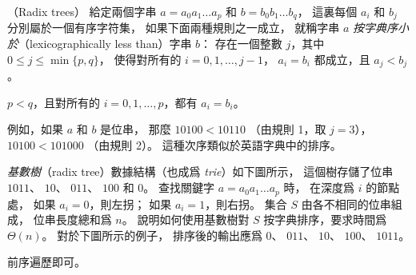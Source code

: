 \startPROBLEM
（Radix trees）
給定兩個字串 $a=a_0 a_1 \ldots a_p$ 和 $b=b_0 b_1 \ldots b_q$，
這裏每個 $a_i$ 和 $b_j$ 分別屬於一個有序字符集，
如果下面兩種規則之一成立，
就稱字串 $a$ \emph{按字典序小於}（lexicographically less than）字串 $b$：
\startigBase[n]
\startitem
存在一個整數 $j$，其中 $0\le j \le \min\{p,q\}$，
使得對所有的 $i=0,1,\ldots,j-1$， $a_i=b_i$ 都成立，且 $a_j < b_j$。
\stopitem

\startitem
$p<q$，且對所有的 $i=0,1,\ldots,p$，都有 $a_i=b_i$。
\stopitem
\stopigBase

例如，如果 $a$ 和 $b$ 是位串，
那麼 $10 100 < 10 110$ （由規則 1，取 $j=3$），
 $10 100 < 101 000$ （由規則 2）。
這種次序類似於英語字典中的排序。

\emph{基數樹}（radix tree）數據結構（也成爲 \emph{trie}）如下圖所示，
這個樹存儲了位串 $1011$、 $10$、 $011$、 $100$ 和 $0$。
查找關鍵字 $a=a_0 a_1 \ldots a_p$ 時，
在深度爲 $i$ 的節點處，
如果 $a_i=0$，則左拐；
如果 $a_i=1$，則右拐。
集合 $S$ 由各不相同的位串組成，
位串長度總和爲 $n$。
說明如何使用基數樹對 $S$ 按字典排序，要求時間爲 $\Theta(n)$。
對於下圖所示的例子，
排序後的輸出應爲 $0$、 $011$、 $10$、 $100$、 $1011$。

\externalfigure[p12_2-1]
\stopPROBLEM

\startANSWER
前序遍歷即可。
\stopANSWER
